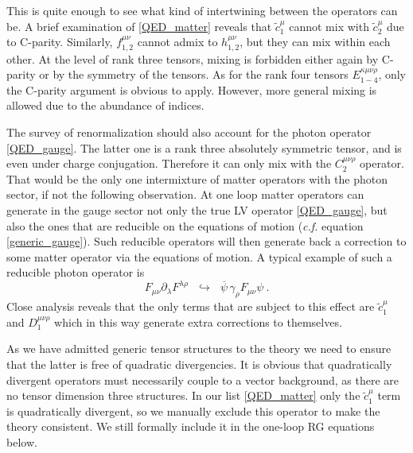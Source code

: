 \documentclass[12pt]{revtex4}
\newcommand{\wt}{\widetilde}
\newcommand{\ov}{\overline}
\begin{document}
	This is quite enough to see what kind of intertwining between 
	the operators can be.
	A brief examination of \eqref{QED_matter} reveals that
	$ \wt{c}_1^\mu $ cannot mix with $ \wt{c}_2^\mu $ due to C-parity.
	Similarly, $ f_{1,2}^{\mu\nu} $ cannot admix to $ h_{1,2}^{\mu\nu} $,
	but they can mix within each other.
	At the level of rank three tensors, mixing is forbidden either
	again by C-parity or by the symmetry of the tensors. 
	As for the rank four tensors $ E_{1-4}^{\kappa\mu\nu\rho} $,
	only the C-parity argument is obvious to apply.
	However, more general mixing is allowed due to the abundance
	of indices.
		
	The survey of renormalization should also account for the photon
	operator \eqref{QED_gauge}.
	The latter one is a rank three absolutely symmetric tensor, 
	and is even under charge conjugation.  
	Therefore it can only mix with the $ C_2^{\mu\nu\rho} $ operator.
	That would be the only one intermixture of matter operators with
	the photon sector, if not the following observation.
	At one loop matter operators can generate in the gauge sector not 
	only the true LV operator \eqref{QED_gauge}, 
	but also the ones that are reducible on the equations of motion
	({\it c.f.} equation \eqref{generic_gauge}).
	Such reducible operators will then generate back a correction to 
	some matter operator via the equations of motion.
	A typical example of such a reducible photon operator is 
\[
 	F_{\mu\nu} \partial_\lambda F^{\lambda\rho} 
	~~~\hookrightarrow~~~
		\ov{\psi}\, \gamma_\rho F_{\mu\nu} \psi
	~.
\]
	Close analysis reveals that the only terms that are subject
	to this effect are $ \wt{c}_1^\mu $ and $ D_1^{\mu\nu\rho} $
	which in this way generate extra corrections to themselves.

	As we have admitted generic tensor structures to the theory
	we need to ensure that the latter is free of quadratic divergencies.
	It is obvious that quadratically divergent operators must necessarily
	couple to a vector background, as there are no tensor dimension
	three structures. 
	In our list \eqref{QED_matter} only the $ \wt{c}_1^\mu $ term is
	quadratically divergent, so we manually exclude this operator
	to make the theory consistent.
	We still formally include it in the one-loop RG equations below.
\end{document}
